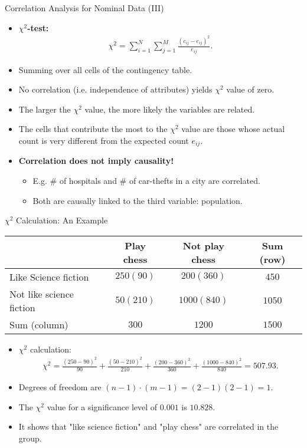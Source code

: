 \begin{frame}{Correlation Analysis for Nominal Data (III)}
	\begin{itemize}
		\item \textbf{\color{airforceblue}$\chi^2$-test:}
		\begin{align}
			\chi^2 = \sum_{i=1}^{N}\sum_{j=1}^{M} 
			\frac{(c_{ij}-e_{ij})^2}{e_{ij}}. 
		\end{align}
		\item Summing over all cells of the contingency table.
		\item No correlation (i.e. independence of attributes) yields $\chi^2$ 
		value of zero.
		\item The larger the $\chi^2$ value, the more likely the variables are 
		related.
		\item The cells that contribute the most to the $\chi^2$ value
		are those whose actual count is very different from the expected count 
		$e_{ij}$.
	\end{itemize}
	\begin{itemize}
		\item \textbf{Correlation does not imply causality!}
		\begin{itemize}
			\item E.g. $\#$ of hospitals and $\#$ of car-thefts in a city are 
			correlated.
			\item Both are causally linked to the third variable: population.
		\end{itemize}
	\end{itemize}
\end{frame}

\begin{frame}{$\chi^2$ Calculation: An Example}
	\centering
	\begin{tabular}{l|c|c|c|}
		& Play chess & Not play chess & Sum (row) \\\hline
		Like Science fiction     & $250 (90)$ & $200 (360)$    & $450$     
		\\\hline
		Not like science fiction & $50 (210)$ & $1000 (840)$   & $1050$    
		\\\hline
		Sum (column)             & $300$      & $1200$         & $1500$    
		\\\hline
	\end{tabular}
	\begin{itemize}
		\item $\chi^2$ calculation:
		\begin{align}
			\chi^2 = \frac{(250-90)^2}{90} + \frac{(50-210)^2}{210} + 
			\frac{(200-360)^2}{360} + \frac{(1000-840)^2}{840} = 507.93. 
		\end{align}
		\item Degrees of freedom are $(n-1)\cdot(m-1) = (2-1)(2-1) = 1$.
		\item The $\chi^2$ value for a significance level of $0.001$ is 
		$10.828$.
		\item It shows that "like science fiction" and "play chess" are 
		correlated in the group.
	\end{itemize}
\end{frame}

